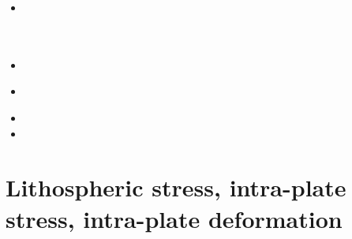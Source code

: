\begin{scriptsize}
\begin{itemize}
 \\
 \\
 \\
 \\
\item[\twothousandtwenty] 
 \\
 \\
 \\
\item[\twothousandtwentyone] 
\item[\twothousandtwentytwo] 
 \\
\item[\twothousandtwentythree] 
\item[\twothousandtwentyfour] 
\end{itemize}
\end{scriptsize}

\section{Lithospheric stress, intra-plate stress, intra-plate deformation}

